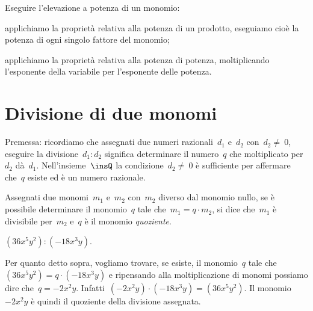 \begin{procedura}
Eseguire l'elevazione a potenza di un monomio:

\begin{enumeratea}
 \item applichiamo la proprietà relativa alla potenza di un prodotto,
eseguiamo cioè la potenza di ogni singolo fattore del monomio;
 \item applichiamo la proprietà relativa alla potenza di potenza,
moltiplicando l'esponente della variabile per l'esponente delle potenza.
\end{enumeratea}
\end{procedura}

\ovalbox{\risolvii \ref{ese:10.16}, \ref{ese:10.17}, \ref{ese:10.18}, \ref{ese:10.19}}

\section{Divisione di due monomi}

Premessa: ricordiamo che assegnati due numeri razionali~$d_{1}$
e~$d_{2}$ con~$d_{2}\neq~0$, eseguire la
divisione~$d_{1}:d_{2}$ significa determinare il numero~$q$
che moltiplicato per~$d_{2}$ dà~$d_{1}$.
Nell'insieme~$\insQ$ la condizione~$d_{2}\neq~0$ è sufficiente per
affermare che~$q$ esiste ed è un numero razionale.

\begin{definizione}
Assegnati due monomi~$m_{1}$ e~$m_{2}$ con~$m_{2}$ diverso dal monomio nullo, se
è possibile determinare il monomio~$q$ tale che~$m_{1} = q\cdot m_{2}$, si dice che~$m_{1}$ è
divisibile per~$m_{2}$ e~$q$ è il monomio \emph{quoziente}.
\end{definizione}

\begin{exrig}
 \begin{esempio}
$(36x^{5}y^{2}):(-18x^{3}y)$.

Per quanto detto sopra, vogliamo trovare, se esiste, il monomio~$q$ tale
che~$(36x^{5}y^{2})=q\cdot (-18x^{3}y)$
e ripensando alla moltiplicazione di monomi possiamo dire
che~$q=-2x^{2}y$. Infatti~$(-2x^{2}y)\cdot(-18x^{3}y)=(36x^{5}y^{2})$. Il monomio~$-2x^{2}y$
è quindi il quoziente della divisione assegnata.
 \end{esempio}
\end{exrig}

